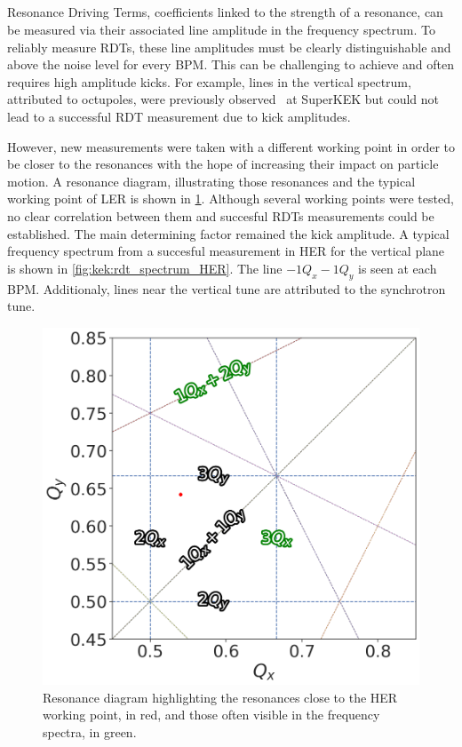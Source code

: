 \FloatBarrier
\subsection{}

Resonance Driving Terms, coefficients linked to the strength of a resonance, can be measured via
their associated line amplitude in the frequency spectrum. To reliably measure RDTs, these
line amplitudes must be clearly distinguishable and above the noise level for every BPM. This can be
challenging to achieve and often requires high amplitude kicks.
For example, lines in the vertical spectrum, attributed to octupoles, were previously
observed~\cite{keintzel_jacqueline_beam_2022} at SuperKEK but could not lead to a successful RDT
measurement due to kick amplitudes.

However, new measurements were taken with a different working point in order to be closer to the 
resonances with the hope of increasing their impact on particle motion. A resonance diagram,
illustrating those resonances and the typical working point of LER is shown in
\cref{fig:kek:tune_diagram}. Although several working points were tested, no clear correlation
between them and succesful RDTs measurements could be established. The main determining factor
remained the kick amplitude. A typical frequency spectrum from a succesful measurement in HER for
the vertical plane is shown in \cref{fig:kek:rdt_spectrum_HER}. The line $-1Q_x - 1Q_y$ is seen at
each BPM. Additionaly, lines near the vertical tune are attributed to the synchrotron tune.

\begin{figure}[!htb]
    \centering
    \includegraphics[width=0.6\linewidth]{images/kek/tune_diagram.png}
    \caption{Resonance diagram highlighting the resonances close to the HER working point, in red, 
    and those often visible in the frequency spectra, in green.}
    \label{fig:kek:tune_diagram}
\end{figure}

